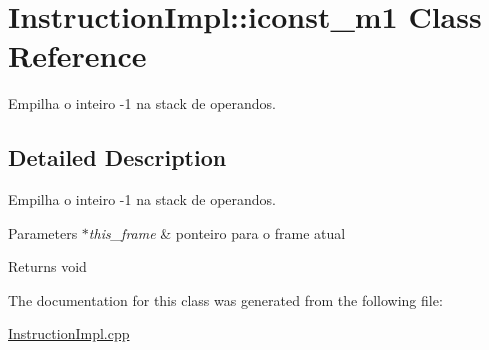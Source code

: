 \hypertarget{class_instruction_impl_1_1iconst__m1}{}\section{Instruction\+Impl\+:\+:iconst\+\_\+m1 Class Reference}
\label{class_instruction_impl_1_1iconst__m1}


Empilha o inteiro -\/1 na stack de operandos.  




\subsection{Detailed Description}
Empilha o inteiro -\/1 na stack de operandos. 


\begin{DoxyParams}{Parameters}
{\em $\ast$this\+\_\+frame} & ponteiro para o frame atual \\
\hline
\end{DoxyParams}
\begin{DoxyReturn}{Returns}
void 
\end{DoxyReturn}


The documentation for this class was generated from the following file\+:\begin{DoxyCompactItemize}
\item 
\hyperlink{_instruction_impl_8cpp}{Instruction\+Impl.\+cpp}\end{DoxyCompactItemize}
